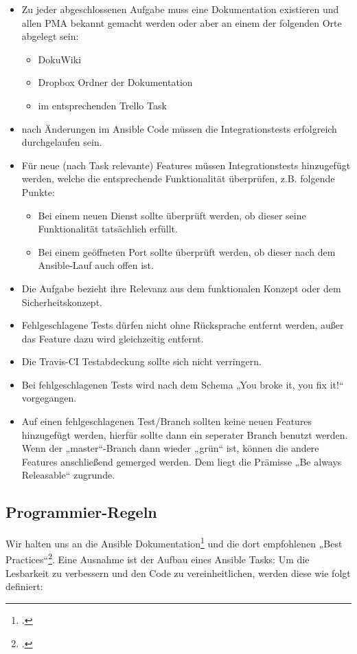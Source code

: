 \begin{itemize}
\item Zu jeder abgeschlossenen Aufgabe muss eine Dokumentation existieren und allen PMA bekannt gemacht werden oder aber an einem der folgenden Orte abgelegt sein:
\begin{itemize}
\item DokuWiki
\item Dropbox Ordner der Dokumentation
\item im entsprechenden Trello Task
\end{itemize}
\item nach Änderungen im Ansible Code müssen die Integrationstests erfolgreich durchgelaufen sein.
\item Für neue (nach Task relevante) Features müssen Integrationstests hinzugefügt werden, welche die entsprechende Funktionalität überprüfen, z.B. folgende Punkte:
\begin{itemize}
\item Bei einem neuen Dienst sollte überprüft werden, ob dieser seine Funktionalität tatsächlich erfüllt.
\item Bei einem geöffneten Port sollte überprüft werden, ob dieser nach dem Ansible-Lauf auch offen ist.
\end{itemize}
\item Die Aufgabe bezieht ihre Relevanz aus dem funktionalen Konzept oder dem Sicherheitskonzept.
\item Fehlgeschlagene Tests dürfen nicht ohne Rücksprache entfernt werden, außer das Feature dazu wird gleichzeitig entfernt.
\item Die Travis-CI Testabdeckung sollte sich nicht verringern.
\item Bei fehlgeschlagenen Tests wird nach dem Schema „You broke it, you fix it!“ vorgegangen.
\item Auf einen fehlgeschlagenen Test/Branch sollten keine neuen Features hinzugefügt werden, hierfür sollte dann ein seperater Branch benutzt werden. Wenn der „master“-Branch dann wieder „grün“ ist, können die andere Features anschließend gemerged werden. Dem liegt die Prämisse „Be always Releasable“ zugrunde.
\end{itemize}

\subsection{Programmier-Regeln}
Wir halten uns an die Ansible Dokumentation\footcite{ansible} und die dort empfohlenen „Best Practices“\footcite{ansibleBestPractice}. Eine Ausnahme ist der Aufbau eines Ansible Tasks: Um die Lesbarkeit zu verbessern und den Code zu vereinheitlichen, werden diese wie folgt definiert:

